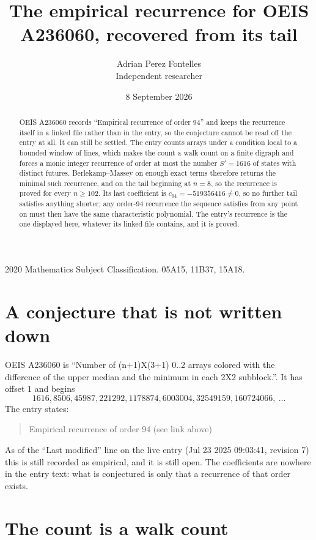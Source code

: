 \documentclass[11pt,a4paper]{article}
\title{The empirical recurrence for OEIS A236060, recovered from its tail}
\author{Adrian Perez Fontelles\\ \small Independent researcher}
\date{8 September 2026}
\theoremstyle{plain}
\theoremstyle{definition}
\begin{document}
\maketitle

\begin{abstract}
OEIS A236060 records ``Empirical recurrence of order $94$'' and keeps the recurrence itself in
a linked file rather than in the entry, so the conjecture cannot be read off the entry at all.
It can still be settled. The entry counts arrays under a condition local to a bounded window of
lines, which makes the count a walk count on a finite digraph and forces a monic integer
recurrence of order at most the number $S'=1616$ of states with distinct futures. Berlekamp--Massey on
enough exact terms therefore returns the minimal such recurrence, and on the tail beginning at $n=8$, so the recurrence is proved for every $n\ge102$.
Its last coefficient is $c_{94}=-519356416\neq0$, so no further tail satisfies anything
shorter; any order-$94$ recurrence the sequence satisfies from any point on must then have
the same characteristic polynomial. The entry's recurrence is the one displayed here, whatever
its linked file contains, and it is proved.
\end{abstract}

\noindent\small 2020 Mathematics Subject Classification. 05A15, 11B37, 15A18.\normalsize

\section{A conjecture that is not written down}

OEIS A236060 is ``Number of (n+1)X(3+1) 0..2 arrays colored with the difference of the upper median and the minimum in each 2X2 subblock.''. It has offset $1$ and begins
\[
1616, 8506, 45987, 221292, 1178874, 6003004, 32549159, 160724066,\ \dots
\]
The entry states:
\begin{quote}
Empirical recurrence of order 94 (see link above)
\end{quote}
As of the ``Last modified'' line on the live entry (Jul 23 2025 09:03:41, revision 7)
this is still recorded as empirical, and it is still open. The coefficients are nowhere in the
entry text: what is conjectured is only that a recurrence of that order exists.

\section{The count is a walk count}
\end{document}
